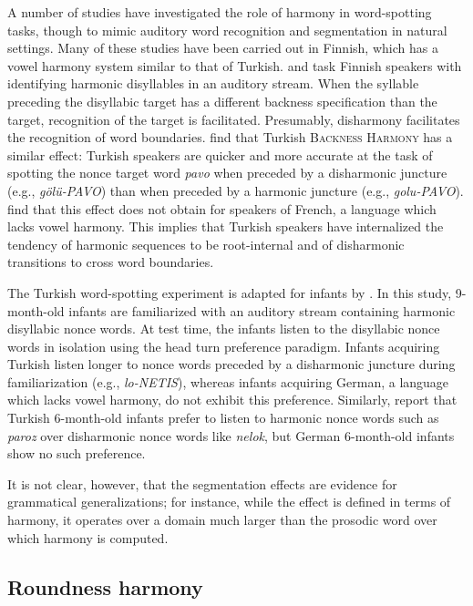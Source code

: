 A number of studies have investigated the role of harmony in word-spotting tasks, though to mimic auditory word recognition and segmentation in natural settings. Many of these studies have been carried out in Finnish, which has a vowel harmony system similar to that of Turkish. \citet{Suomi1997} and \citet{Vroomen1998} task Finnish speakers with identifying harmonic disyllables in an auditory stream. When the syllable preceding the disyllabic target has a different backness specification than the target, recognition of the target is facilitated. Presumably, disharmony facilitates the recognition of word boundaries. \citet{Kabak2010} find that Turkish \textsc{Backness Harmony} has a similar effect: Turkish speakers are quicker and more accurate at the task of spotting the nonce target word \emph{pavo} when preceded by a disharmonic juncture (e.g., \emph{gölü-PAVO}) than when preceded by a harmonic juncture (e.g., \emph{golu-PAVO}). \citet{Kabak2010} find that this effect does not obtain for speakers of French, a language which lacks vowel harmony. This implies that Turkish speakers have internalized the tendency of harmonic sequences to be root-internal and of disharmonic transitions to cross word boundaries. 

The Turkish word-spotting experiment is adapted for infants by \citet{Kampen2008}. In this study, 9-month-old infants are familiarized with an auditory stream containing harmonic disyllabic nonce words. At test time, the infants listen to the disyllabic nonce words in isolation using the head turn preference paradigm. Infants acquiring Turkish listen longer to nonce words preceded by a disharmonic juncture during familiarization (e.g., \emph{lo-NETIS}), whereas infants acquiring German, a language which lacks vowel harmony, do not exhibit this preference. Similarly, \citeauthor{Kampen2008} report that Turkish 6-month-old infants prefer to listen to harmonic nonce words such as \emph{paroz} over disharmonic nonce words like \emph{nelok}, but German 6-month-old infants show no such preference.

It is not clear, however, that the segmentation effects are evidence for grammatical generalizations; for instance, while the effect is defined in terms of harmony, it operates over a domain much larger than the prosodic word over which harmony is computed.

\subsection{Roundness harmony}

